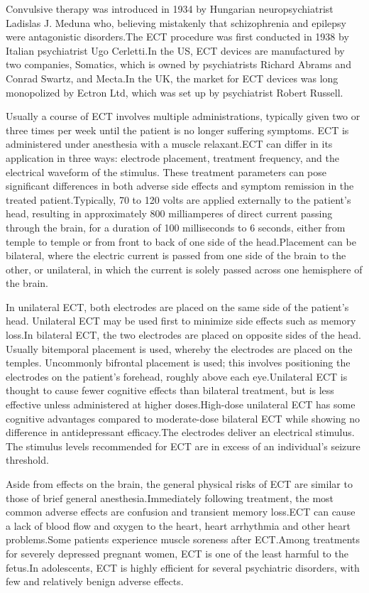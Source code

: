 \documentclass[12pt,A4paper]{article}
\begin{document}
Convulsive therapy was introduced in 1934 by Hungarian neuropsychiatrist Ladislas J. Meduna who, believing mistakenly that schizophrenia and epilepsy were antagonistic disorders.The ECT procedure was first conducted in 1938 by Italian psychiatrist Ugo Cerletti.In the US, ECT devices are manufactured by two companies, Somatics, which is owned by psychiatrists Richard Abrams and Conrad Swartz, and Mecta.In the UK, the market for ECT devices was long monopolized by Ectron Ltd, which was set up by psychiatrist Robert Russell.

Usually a course of ECT involves multiple administrations, typically given two or three times per week until the patient is no longer suffering symptoms. ECT is administered under anesthesia with a muscle relaxant.ECT can differ in its application in three ways: electrode placement, treatment frequency, and the electrical waveform of the stimulus. These treatment parameters can pose significant differences in both adverse side effects and symptom remission in the treated patient.Typically, 70 to 120 volts are applied externally to the patient's head, resulting in approximately 800 milliamperes of direct current passing through the brain, for a duration of 100 milliseconds to 6 seconds, either from temple to temple or from front to back of one side of the head.Placement can be bilateral, where the electric current is passed from one side of the brain to the other, or unilateral, in which the current is solely passed across one hemisphere of the brain. 

In unilateral ECT, both electrodes are placed on the same side of the patient's head. Unilateral ECT may be used first to minimize side effects such as memory loss.In bilateral ECT, the two electrodes are placed on opposite sides of the head. Usually bitemporal placement is used, whereby the electrodes are placed on the temples. Uncommonly bifrontal placement is used; this involves positioning the electrodes on the patient's forehead, roughly above each eye.Unilateral ECT is thought to cause fewer cognitive effects than bilateral treatment, but is less effective unless administered at higher doses.High-dose unilateral ECT has some cognitive advantages compared to moderate-dose bilateral ECT while showing no difference in antidepressant efficacy.The electrodes deliver an electrical stimulus. The stimulus levels recommended for ECT are in excess of an individual's seizure threshold.

Aside from effects on the brain, the general physical risks of ECT are similar to those of brief general anesthesia.Immediately following treatment, the most common adverse effects are confusion and transient memory loss.ECT can cause a lack of blood flow and oxygen to the heart, heart arrhythmia and other heart problems.Some patients experience muscle soreness after ECT.Among treatments for severely depressed pregnant women, ECT is one of the least harmful to the fetus.In adolescents, ECT is highly efficient for several psychiatric disorders, with few and relatively benign adverse effects.
\end{document}

